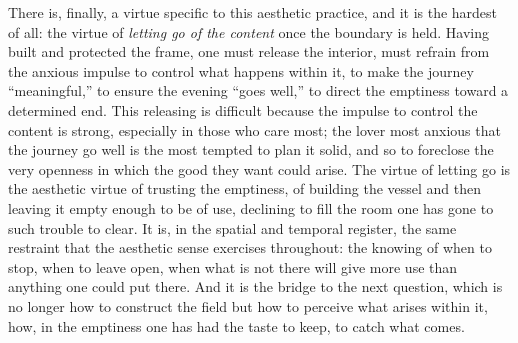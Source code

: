 There is, finally, a virtue specific to this aesthetic practice, and it is the hardest of all: the virtue of \emph{letting go of the content} once the boundary is held. Having built and protected the frame, one must release the interior, must refrain from the anxious impulse to control what happens within it, to make the journey ``meaningful,'' to ensure the evening ``goes well,'' to direct the emptiness toward a determined end. This releasing is difficult because the impulse to control the content is strong, especially in those who care most; the lover most anxious that the journey go well is the most tempted to plan it solid, and so to foreclose the very openness in which the good they want could arise. The virtue of letting go is the aesthetic virtue of trusting the emptiness, of building the vessel and then leaving it empty enough to be of use, declining to fill the room one has gone to such trouble to clear. It is, in the spatial and temporal register, the same restraint that the aesthetic sense exercises throughout: the knowing of when to stop, when to leave open, when what is not there will give more use than anything one could put there. And it is the bridge to the next question, which is no longer how to construct the field but how to perceive what arises within it, how, in the emptiness one has had the taste to keep, to catch what comes.

